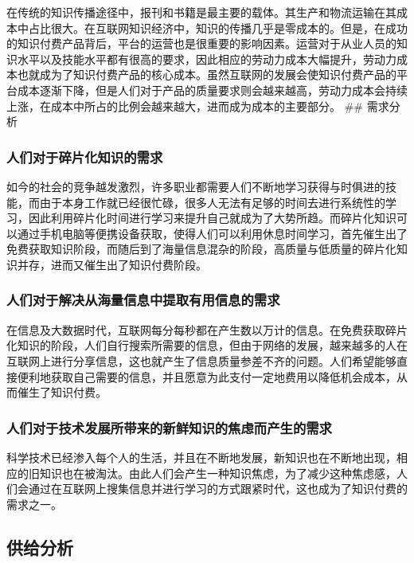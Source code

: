 \documentclass[UTF8,a4paper,12pt]{ctexart}  %
\begin{document}
在传统的知识传播途径中，报刊和书籍是最主要的载体。其生产和物流运输在其成本中占比很大。在互联网知识经济中，知识的传播几乎是零成本的。但是，在成功的知识付费产品背后，平台的运营也是很重要的影响因素。运营对于从业人员的知识水平以及技能水平都有很高的要求，因此相应的劳动力成本大幅提升，劳动力成本也就成为了知识付费产品的核心成本。虽然互联网的发展会使知识付费产品的平台成本逐渐下降，但是人们对于产品的质量要求则会越来越高，劳动力成本会持续上涨，在成本中所占的比例会越来越大，进而成为成本的主要部分。
\#\# 需求分析

\hypertarget{section-8}{%
\subsubsection{人们对于碎片化知识的需求}\label{section-8}}

如今的社会的竞争越发激烈，许多职业都需要人们不断地学习获得与时俱进的技能，而由于本身工作就已经很忙碌，很多人无法有足够的时间去进行系统性的学习，因此利用碎片化时间进行学习来提升自己就成为了大势所趋。而碎片化知识可以通过手机电脑等便携设备获取，使得人们可以利用休息时间学习，首先催生出了免费获取知识阶段，而随后到了海量信息混杂的阶段，高质量与低质量的碎片化知识并存，进而又催生出了知识付费阶段。

\hypertarget{section-9}{%
\subsubsection{人们对于解决从海量信息中提取有用信息的需求}\label{section-9}}

在信息及大数据时代，互联网每分每秒都在产生数以万计的信息。在免费获取碎片化知识的阶段，人们自行搜索所需要的信息，但由于网络的发展，越来越多的人在互联网上进行分享信息，这也就产生了信息质量参差不齐的问题。人们希望能够直接便利地获取自己需要的信息，并且愿意为此支付一定地费用以降低机会成本，从而催生了知识付费。

\hypertarget{section-10}{%
\subsubsection{人们对于技术发展所带来的新鲜知识的焦虑而产生的需求}\label{section-10}}

科学技术已经渗入每个人的生活，并且在不断地发展，新知识也在不断地出现，相应的旧知识也在被淘汰。由此人们会产生一种知识焦虑，为了减少这种焦虑感，人们会通过在互联网上搜集信息并进行学习的方式跟紧时代，这也成为了知识付费的需求之一。

\hypertarget{section-11}{%
\subsection{供给分析}\label{section-11}}
\end{document}
